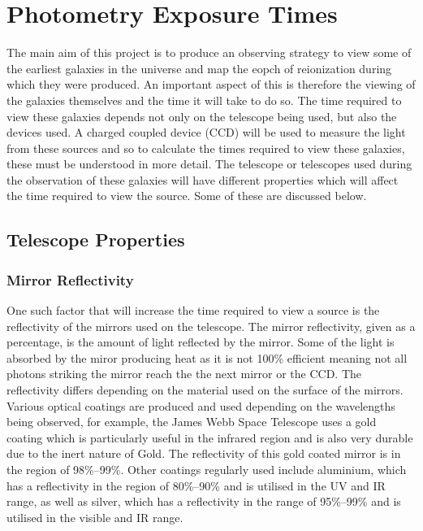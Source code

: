 
\section{Photometry Exposure Times} %
\label{sec:exposure_times}
	The main aim of this project is to produce an observing strategy to view some of the earliest galaxies in the universe and map the eopch of reionization during which they were produced. An important aspect of this is therefore the viewing of the galaxies themselves and the time it will take to do so. The time required to view these galaxies depends not only on the telescope being used, but also the devices used. A charged coupled device (CCD) will be used to measure the light from these sources and so to calculate the times required to view these galaxies, these must be understood in more detail. The telescope or telescopes used during the observation of these galaxies will have different properties which will affect the time required to view the source. Some of these are discussed below.

	\subsection{Telescope Properties} %
	\label{sub:telescope_properties}
		\subsubsection{Mirror Reflectivity} %
		\label{ssub:mirror_reflectivity}
			One such factor that will increase the time required to view a source is the reflectivity of the mirrors used on the telescope. The mirror reflectivity, given as a percentage, is the amount of light reflected by the mirror. Some of the light is absorbed by the miror producing heat as it is not 100\% efficient meaning not all photons striking the mirror reach the the next mirror or the CCD. The reflectivity differs depending on the material used on the surface of the mirrors. Various optical coatings are produced and used depending on the wavelengths being observed, for example, the James Webb Space Telescope uses a gold coating which is particularly useful in the infrared region and is also very durable due to the inert nature of Gold. The reflectivity of this gold coated mirror is in the region of 98\%--99\%\cite{Quantum_Coatings_Incorporated}. Other coatings regularly used include aluminium, which has a reflectivity in the region of 80\%--90\% and is utilised in the UV and IR range, as well as silver, which has a reflectivity in the range of 95\%--99\% and is utilised in the visible and IR range.

